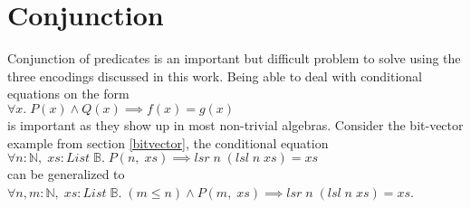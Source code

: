 \section{Conjunction}
Conjunction of predicates is an important
but difficult problem to solve using the three
encodings discussed in this work.
Being able to deal with conditional equations on the form
\\$\forall x.\;P(x)\wedge Q(x)\implies f(x)=g(x)$\\
is important as they show up in most non-trivial
algebras. Consider the bit-vector example from section
\ref{bitvector}, the conditional equation
\\$\forall n:\mathbb{N},\;xs:List\;\mathbb{B}.\;P(n,\;xs)\implies lsr\;n\;(lsl\;n\;xs)=xs$\\
can be generalized to
\\$\forall n,m:\mathbb{N},\;xs:List\;\mathbb{B}.\;(m\leq n)\wedge P(m,\;xs)\implies lsr\;n\;(lsl\;n\;xs)=xs$.
